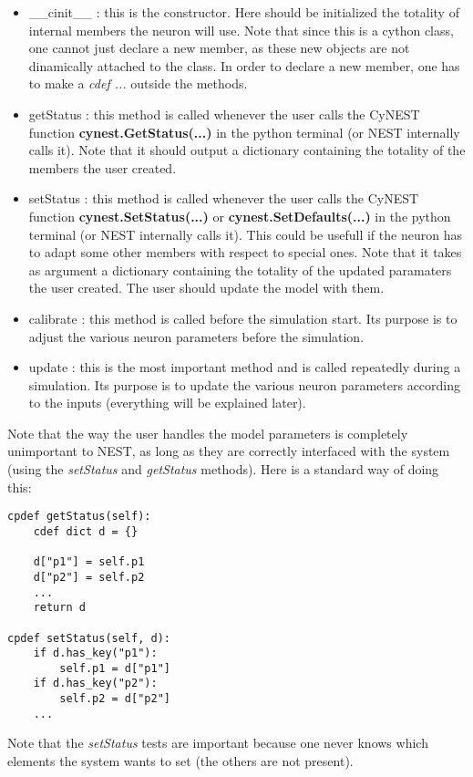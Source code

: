 \documentclass{article}
\begin{document}
\begin{itemize}
\item \_\_cinit\_\_ : this is the constructor. Here should be initialized the totality of internal members the neuron will use. Note that since this is a cython class, one cannot just declare a new member, as these new objects are not dinamically attached to the class. In order to declare a new member, one has to make a \emph{cdef ...} outside the methods. 
\item getStatus : this method is called whenever the user calls the CyNEST function \textbf{ cynest.GetStatus(...)} in the python terminal (or NEST internally calls it). Note that it should output a dictionary containing the totality of the members the user created.
\item setStatus : this method is called whenever the user calls the CyNEST function \textbf{ cynest.SetStatus(...)} or \textbf{cynest.SetDefaults(...)} in the python terminal (or NEST internally calls it). This could be usefull if the neuron has to adapt some other members with respect to special ones. Note that it takes as argument a dictionary containing the totality of the updated paramaters the user created. The user should update the model with them.
\item calibrate : this method is called before the simulation start. Its purpose is to adjust the various neuron parameters before the simulation.
\item update : this is the most important method and is called repeatedly during a simulation. Its purpose is to update the various neuron parameters according to the inputs (everything will be explained later).
\end{itemize}
Note that the way the user handles the model parameters is completely unimportant to NEST, as long as they are correctly interfaced with the system (using the \emph{setStatus} and \emph{getStatus} methods). Here is a standard way of doing this:
\begin{verbatim}
cpdef getStatus(self):
    cdef dict d = {}

    d["p1"] = self.p1
    d["p2"] = self.p2
    ...
    return d

cpdef setStatus(self, d):
    if d.has_key("p1"):
        self.p1 = d["p1"]
    if d.has_key("p2"):
        self.p2 = d["p2"]
    ...
\end{verbatim}
Note that the \emph{setStatus} tests are important because one never knows which elements the system wants to set (the others are not present).
\end{document}
